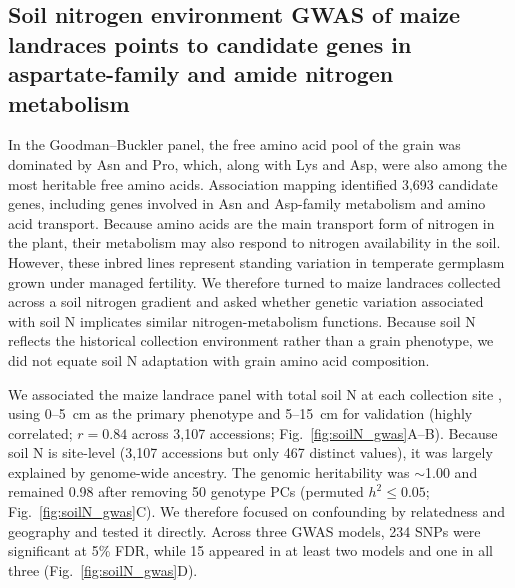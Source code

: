 \subsection{Soil nitrogen environment GWAS of maize landraces points to candidate genes in aspartate-family and amide nitrogen metabolism}

In the Goodman--Buckler panel, the free amino acid pool of the grain was dominated by Asn and Pro, which, along with Lys and Asp, were also among the most heritable free amino acids. Association mapping identified 3,693 candidate genes, including genes involved in Asn and Asp-family metabolism and amino acid transport. Because amino acids are the main transport form of nitrogen in the plant, their metabolism may also respond to nitrogen availability in the soil. However, these inbred lines represent standing variation in temperate germplasm grown under managed fertility. We therefore turned to maize landraces collected across a soil nitrogen gradient and asked whether genetic variation associated with soil N implicates similar nitrogen-metabolism functions. Because soil N reflects the historical collection environment rather than a grain phenotype, we did not equate soil N adaptation with grain amino acid composition.

We associated the maize landrace panel \citep{RomeroNavarro2017Landraces} with total soil N at each collection site \citep{Batjes2006ISRICWISE5ArcMin}, using 0--5~cm as the primary phenotype and 5--15~cm for validation (highly correlated; $r = 0.84$ across 3,107 accessions; Fig.~\ref{fig:soilN_gwas}A--B). Because soil N is site-level (3,107 accessions but only 467 distinct values), it was largely explained by genome-wide ancestry. The genomic heritability was $\sim$1.00 and remained 0.98 after removing 50 genotype PCs (permuted $h^2 \le 0.05$; Fig.~\ref{fig:soilN_gwas}C). We therefore focused on confounding by relatedness and geography and tested it directly. Across three GWAS models, 234 SNPs were significant at 5\% FDR, while 15 appeared in at least two models and one in all three (Fig.~\ref{fig:soilN_gwas}D).

